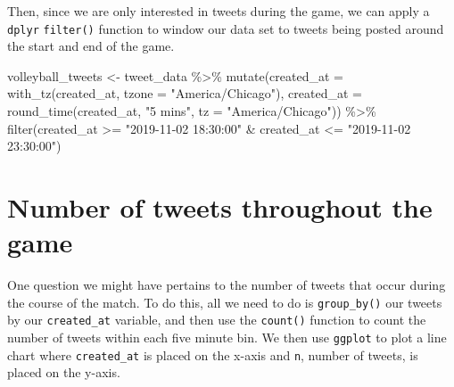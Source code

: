 \documentclass[
]{book}
\newenvironment{Shaded}{\begin{snugshade}}{\end{snugshade}}
\newcommand{\AttributeTok}[1]{\textcolor[rgb]{0.77,0.63,0.00}{#1}}
\newcommand{\FunctionTok}[1]{\textcolor[rgb]{0.00,0.00,0.00}{#1}}
\newcommand{\NormalTok}[1]{#1}
\newcommand{\OtherTok}[1]{\textcolor[rgb]{0.56,0.35,0.01}{#1}}
\newcommand{\SpecialCharTok}[1]{\textcolor[rgb]{0.00,0.00,0.00}{#1}}
\newcommand{\StringTok}[1]{\textcolor[rgb]{0.31,0.60,0.02}{#1}}
\begin{document}
Then, since we are only interested in tweets during the game, we can apply a \texttt{dplyr} \texttt{filter()} function to window our data set to tweets being posted around the start and end of the game.

\begin{Shaded}
\begin{Highlighting}[]
\NormalTok{volleyball\_tweets }\OtherTok{\textless{}{-}}\NormalTok{ tweet\_data }\SpecialCharTok{\%\textgreater{}\%}
  \FunctionTok{mutate}\NormalTok{(}\AttributeTok{created\_at =} \FunctionTok{with\_tz}\NormalTok{(created\_at, }\AttributeTok{tzone =} \StringTok{"America/Chicago"}\NormalTok{),}
         \AttributeTok{created\_at =} \FunctionTok{round\_time}\NormalTok{(created\_at, }\StringTok{"5 mins"}\NormalTok{, }\AttributeTok{tz =} \StringTok{"America/Chicago"}\NormalTok{)) }\SpecialCharTok{\%\textgreater{}\%} 
  \FunctionTok{filter}\NormalTok{(created\_at }\SpecialCharTok{\textgreater{}=} \StringTok{"2019{-}11{-}02 18:30:00"} \SpecialCharTok{\&}\NormalTok{ created\_at }\SpecialCharTok{\textless{}=} \StringTok{"2019{-}11{-}02 23:30:00"}\NormalTok{) }
\end{Highlighting}
\end{Shaded}

\hypertarget{number-of-tweets-throughout-the-game}{%
\section{Number of tweets throughout the game}\label{number-of-tweets-throughout-the-game}}

One question we might have pertains to the number of tweets that occur during the course of the match. To do this, all we need to do is \texttt{group\_by()} our tweets by our \texttt{created\_at} variable, and then use the \texttt{count()} function to count the number of tweets within each five minute bin. We then use \texttt{ggplot} to plot a line chart where \texttt{created\_at} is placed on the x-axis and \texttt{n}, number of tweets, is placed on the y-axis.
\end{document}
